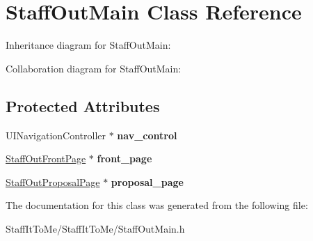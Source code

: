 \hypertarget{interface_staff_out_main}{
\section{\-Staff\-Out\-Main \-Class \-Reference}
\label{interface_staff_out_main}
}


\-Inheritance diagram for \-Staff\-Out\-Main\-:


\-Collaboration diagram for \-Staff\-Out\-Main\-:
\subsection*{\-Protected \-Attributes}
\begin{DoxyCompactItemize}
\item 
\hypertarget{interface_staff_out_main_a2db78435c397d8cab2905e6ab9c9b131}{
\-U\-I\-Navigation\-Controller $\ast$ {\bfseries nav\-\_\-control}}
\label{interface_staff_out_main_a2db78435c397d8cab2905e6ab9c9b131}

\item 
\hypertarget{interface_staff_out_main_a252a4cb67ec5dbea4961459f8f4e0bdf}{
\hyperlink{interface_staff_out_front_page}{\-Staff\-Out\-Front\-Page} $\ast$ {\bfseries front\-\_\-page}}
\label{interface_staff_out_main_a252a4cb67ec5dbea4961459f8f4e0bdf}

\item 
\hypertarget{interface_staff_out_main_a2311edcf62f5838bb257115bcc184ed5}{
\hyperlink{interface_staff_out_proposal_page}{\-Staff\-Out\-Proposal\-Page} $\ast$ {\bfseries proposal\-\_\-page}}
\label{interface_staff_out_main_a2311edcf62f5838bb257115bcc184ed5}

\end{DoxyCompactItemize}


\-The documentation for this class was generated from the following file\-:\begin{DoxyCompactItemize}
\item 
\-Staff\-It\-To\-Me/\-Staff\-It\-To\-Me/\-Staff\-Out\-Main.\-h\end{DoxyCompactItemize}
